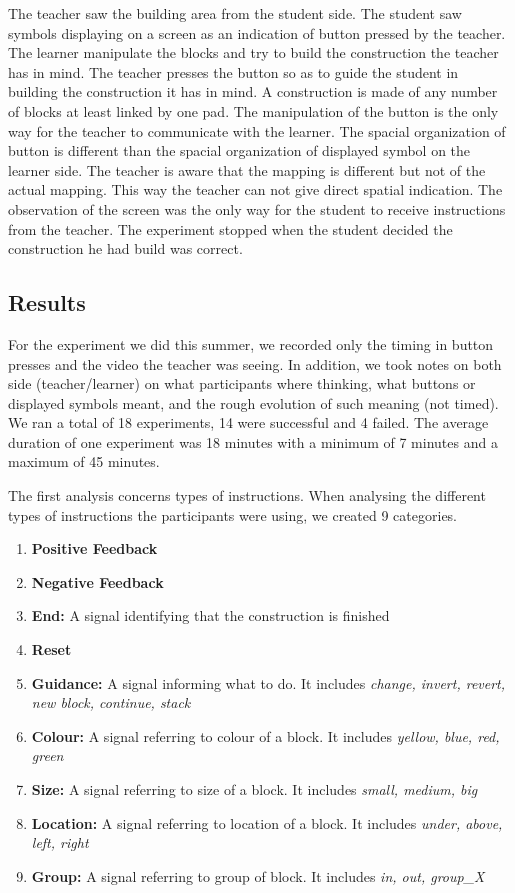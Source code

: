The teacher saw the building area from the student side. The student saw symbols displaying on a screen as an indication of button pressed by the teacher. The learner manipulate the blocks and try to build the construction the teacher has in mind. The teacher presses the button so as to guide the student in building the construction it has in mind. A construction is made of any number of blocks at least linked by one pad. The manipulation of the button is the only way for the teacher to communicate with the learner. The spacial organization of button is different than the spacial organization of displayed symbol on the learner side. The teacher is aware that the mapping is different but not of the actual mapping. This way the teacher can not give direct spatial indication. The observation of the screen was the only way for the student to receive instructions from the teacher. The experiment stopped when the student decided the construction he had build was correct.

\subsection{Results}

For the experiment we did this summer, we recorded only the timing in button presses and the video the teacher was seeing. In addition, we took notes on both side (teacher/learner) on what participants where thinking, what buttons or displayed symbols meant, and the rough evolution of such meaning (not timed). We ran a total of 18 experiments, 14 were successful and 4 failed. The average duration of one experiment was 18 minutes with a minimum of 7 minutes and a maximum of 45 minutes.

The first analysis concerns types of instructions. When analysing the different types of instructions the participants were using, we created 9 categories.
\begin{enumerate}
    \item \textbf{Positive Feedback}
    \item \textbf{Negative Feedback}
    \item \textbf{End:} A signal identifying that the construction is finished 
    \item \textbf{Reset}
    \item \textbf{Guidance:} A signal informing what to do. It includes \emph{change, invert, revert, new block, continue, stack} 
    \item \textbf{Colour:} A signal referring to colour of a block. It includes \emph{yellow, blue, red, green}
    \item \textbf{Size:} A signal referring to size of a block. It includes \emph{small, medium, big}
    \item \textbf{Location:} A signal referring to location of a block. It includes \emph{under, above, left, right}
    \item \textbf{Group:} A signal referring to group of block. It includes \emph{in, out, group\_X}
\end{enumerate}


